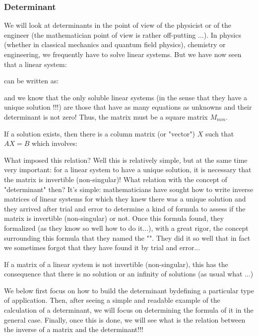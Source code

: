 	\subsubsection{Determinant}
	We will look at determinants in the point of view of the physicist or of the engineer (the mathematician point of view is rather off-putting ...). In physics (whether in classical mechanics and quantum field physics), chemistry or engineering, we frequently have to solve linear systems. But we have now seen that a linear system:
	
	can be written as:
	
	and we know that the only soluble linear systems (in the sense that they have a unique solution !!!) are those that have as many equations as unknowns and their determinant is not zero! Thus, the matrix must be a square matrix $M_{mm}$.
	
	If a solution exists, then there is a column matrix (or "vector") $X$ such that $AX=B$ which involves:
	
	What imposed this relation? Well this is relatively simple, but at the same time very important: for a linear system to have a unique solution, it is necessary that the matrix is invertible (non-singular)! What relation with the  concept of "determinant" then? It's simple: mathematicians have sought how to write inverse matrices of linear systems for which they knew there was a unique solution and they arrived after trial and error to determine a kind of formula to assess if the matrix is invertible (non-singular) or not. Once this formula found, they formalized (as they know so well how to do it...), with a great rigor, the concept surrounding this formula that they named the "". They did it so well that in fact we sometimes forgot that they have found it by trial and error...
	\begin{tcolorbox}[title=Remarks,colframe=black,arc=10pt]
	If a matrix of a linear system is not invertible (non-singular), this has the consequence that there is no solution or an infinity of solutions (as usual what ...)
	\end{tcolorbox}
	We below first focus on how to build the determinant bydefining a particular type of application. Then, after seeing a simple and readable example of the calculation of a determinant, we will focus on determining the formula of it in the general case. Finally, once this is done, we will see what is the relation between the inverse of a matrix and the determinant!!!
	
